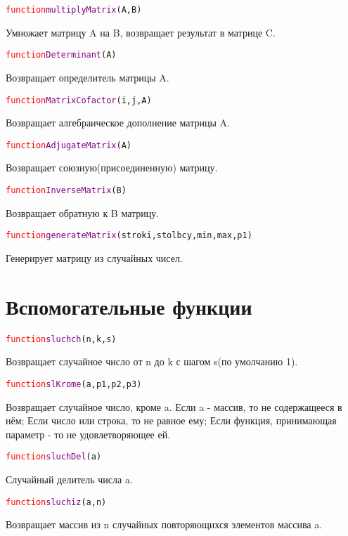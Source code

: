 \documentclass[a4paper,12pt]{article}
\begin{document}
	\begin{alltt} 	\textcolor{Red}{function} \textcolor{Purple}{multiplyMatrix}(A,B)
	\end{alltt}
	Умножает матрицу A на B, возвращает результат в матрице C.
	\begin{alltt} 	\textcolor{Red}{function} \textcolor{Purple}{Determinant}(A)
	\end{alltt}
	Возвращает определитель матрицы A.
	\begin{alltt} 	\textcolor{Red}{function} \textcolor{Purple}{MatrixCofactor}(i,j,A)
	\end{alltt}
	Возвращает алгебраическое дополнение матрицы A.
	\begin{alltt} 	\textcolor{Red}{function} \textcolor{Purple}{AdjugateMatrix}(A)
	\end{alltt}
	Возвращает союзную(присоединенную) матрицу.
	\begin{alltt} 	\textcolor{Red}{function} \textcolor{Purple}{InverseMatrix}(B)
	\end{alltt}
	Возвращает обратную  к B матрицу.
		\begin{alltt} 	\textcolor{Red}{function} \textcolor{Purple}{generateMatrix}(stroki,stolbcy,min,max,p1)
	\end{alltt}
	Генерирует матрицу из случайных чисел.
	\section{Вспомогательные функции}
	\begin{alltt} 	\textcolor{Red}{function} \textcolor{Purple}{sluchch}(n,k,s)
	\end{alltt}
	Возвращает случайное число от n до k с шагом s(по умолчанию 1).
	\begin{alltt} 	\textcolor{Red}{function} \textcolor{Purple}{slKrome}(a,p1,p2,p3)
	\end{alltt}
	Возвращает случайное число, кроме a. Если a \-- массив, то не содержащееся в нём; Если число или строка, то не равное ему; Если функция, принимающая параметр - то не удовлетворяющее ей.
	\begin{alltt} 	\textcolor{Red}{function} \textcolor{Purple}{sluchDel}(a)
	\end{alltt}
	Случайный делитель числа a.
	\begin{alltt} 	\textcolor{Red}{function} \textcolor{Purple}{sluchiz}(a,n)
	\end{alltt}
	Возвращает массив из n случайных повторяющихся элементов массива a. 
\end{document}
